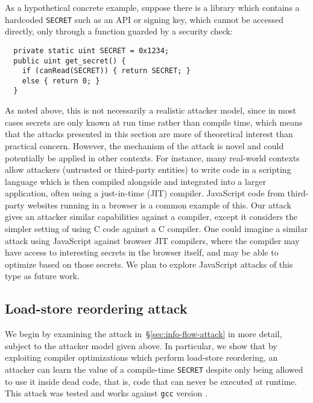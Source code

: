 As a hypothetical concrete example, suppose there is a library which contains
a hardcoded \verb|SECRET| such as an API or signing key, which cannot be accessed
directly, only through a function guarded by a security check:
\begin{verbatim}
  private static uint SECRET = 0x1234;
  public uint get_secret() {
    if (canRead(SECRET)) { return SECRET; }
    else { return 0; }
  }
\end{verbatim}
As noted above, this is not necessarily a realistic attacker model,
since in most cases secrets are only known at run time rather than compile time,
which means that the attacks presented in this section
are more of theoretical interest than practical concern.
However, the mechanism of the attack is novel and could potentially be applied
in other contexts.
For instance, many real-world contexts allow attackers (untrusted or
third-party entities) to write code in a scripting language which is then
compiled alongside and integrated into a larger application, often
using a just-in-time (JIT) compiler.
JavaScript code from third-party websites running in a browser is a common
example of this.
Our attack gives an attacker similar capabilities against a
compiler, except it considers the simpler setting of using C code against a C
compiler.
One could imagine a similar attack using JavaScript against browser JIT
compilers, where the compiler may have access to interesting secrets in the
browser itself, and may be able to optimize based on those secrets.
We plan to explore JavaScript attacks of this type as future work.

\subsection{Load-store reordering attack}
\label{subsec:exp-rel-mem}

We begin by examining the attack in~\S\ref{sec:info-flow-attack} in
more detail, subject to the attacker model given above.
In particular, we show that by exploiting compiler optimizations which perform
load-store reordering, an attacker can learn the value of a compile-time
\verb|SECRET| despite only being allowed to use it inside dead code, that is,
code that can never be executed at runtime.
This attack was tested and works against \verb|gcc| version .

